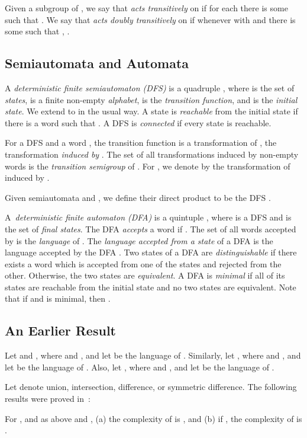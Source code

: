 \documentclass{llncs}
\begin{document}
Given a subgroup  of , we say that  \emph{acts transitively} on  if for each  there is some  such that .  We say that  \emph{acts doubly transitively} on  if whenever  with  and  there is some  such that , .  


\subsection{Semiautomata and Automata}
A \emph{deterministic finite semiautomaton (DFS)} is a quadruple , where 
 is the set of \emph{states},  is a finite non-empty \emph{alphabet},  is the \emph{transition function}, and  is the \emph{initial state}. We extend  to  in the usual way.
A state  is  \emph{reachable} from the initial state if  there is a word  such that 
. 
A DFS is \emph{connected} if every state  is reachable.

For a  DFS  and a word , the transition function   is a transformation of , the transformation \emph{induced by }. 
The set of all transformations induced by non-empty words is the \emph{transition semigroup}  of .
For , we denote by  the transformation  of  induced by .

Given semiautomata  and ,
we define their direct product to be the DFS
.


A~\emph{deterministic finite automaton (DFA)} is a quintuple , where  is a DFS and 
 is the set of \emph{final states}. 
The DFA  \emph{accepts} a word  if . 
The set of all words accepted by  is the \emph{language}  of . 
The \emph{language accepted from a state}  of a DFA is the language  accepted by the DFA
.
Two states of a DFA are \emph{distinguishable} if there exists a word 
which is accepted from one of the states and rejected from the other. Otherwise,
the two states are \emph{equivalent}.
A DFA is \emph{minimal} if all of its states are reachable from the initial state and no two states are equivalent. 
Note that if  and  is minimal, then .

\subsection{An Earlier Result}
Let   and
, where   and , and let  be the language of .
Similarly,  let
, where   and , and let  be the language of .
Also,  let
, where   and , and let  be the language of .

Let  denote union, intersection, difference, or symmetric difference.
The following results were proved in~\cite{Brz12,BrLiu12}:
\begin{proposition}
\label{prop:BrzLiu}
For ,  and  as above and ,  (a) the  complexity of  is , and (b) if , the  complexity of  is .
 \end{proposition}
 
\end{document}
